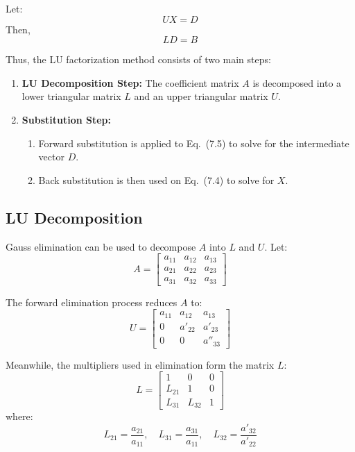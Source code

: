 \documentclass[a4paper,12pt]{article}
\begin{document}
Let:
\begin{equation}
	UX = D \tag{7.4}
\end{equation}
Then,
\begin{equation}
	LD = B \tag{7.5}
\end{equation}

Thus, the LU factorization method consists of two main steps:

\begin{enumerate}
	\item \textbf{LU Decomposition Step:} The coefficient matrix \( A \) is decomposed into a lower triangular matrix \( L \) and an upper triangular matrix \( U \).
	\item \textbf{Substitution Step:} 
	\begin{enumerate}
		\item Forward substitution is applied to Eq.~(7.5) to solve for the intermediate vector \( D \).
		\item Back substitution is then used on Eq.~(7.4) to solve for \( X \).
	\end{enumerate}
\end{enumerate}

\subsection{LU Decomposition}

Gauss elimination can be used to decompose \( A \) into \( L \) and \( U \). Let:
\[
A = 
\begin{bmatrix}
	a_{11} & a_{12} & a_{13} \\
	a_{21} & a_{22} & a_{23} \\
	a_{31} & a_{32} & a_{33}
\end{bmatrix}
\]

The forward elimination process reduces \( A \) to:
\[
U = 
\begin{bmatrix}
	a_{11} & a_{12} & a_{13} \\
	0 & a'_{22} & a'_{23} \\
	0 & 0 & a''_{33}
\end{bmatrix}
\]

Meanwhile, the multipliers used in elimination form the matrix \( L \):
\[
L = 
\begin{bmatrix}
	1 & 0 & 0 \\
	L_{21} & 1 & 0 \\
	L_{31} & L_{32} & 1
\end{bmatrix}
\]
where:
\[
L_{21} = \frac{a_{21}}{a_{11}}, \quad
L_{31} = \frac{a_{31}}{a_{11}}, \quad
L_{32} = \frac{a'_{32}}{a'_{22}}
\]
\end{document}
